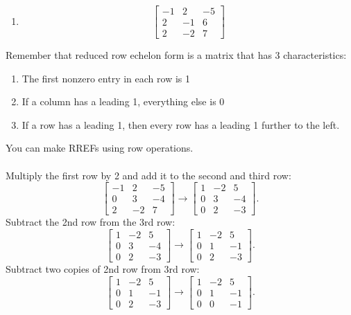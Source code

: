 \documentclass[letterpaper]{report}
\begin{document}
\begin{enumerate}[label=(\alph*)]
    \item \[\begin{bmatrix}
            -1 & 2 & -5 \\
            2 & -1 & 6 \\
            2 & -2 & 7
        \end{bmatrix}
    \] 
\end{enumerate}
Remember that reduced row echelon form is a matrix that has 3 characteristics: 
\begin{enumerate}
    \item The first nonzero entry in each row is 1 
    \item If a column has a leading 1, everything else is 0
    \item If a row has a leading 1, then every row has a leading 1 further to the left. 
\end{enumerate}
You can make RREFs using row operations. \\ \\ 
Multiply the first row by 2 and add it to the second and third row:
\[
\begin{bmatrix} 
    -1 & 2 & -5 \\
    0 & 3 & -4 \\
    2 & -2 & 7
\end{bmatrix} \to 
\begin{bmatrix} 
    1 & -2 & 5 \\
    0 & 3 & -4 \\
    0 & 2 & -3
\end{bmatrix} 
.\] 
Subtract the 2nd row from the 3rd row: 
\[
\begin{bmatrix} 
    1 & -2 & 5 \\
    0 & 3 & -4 \\
    0 & 2 & -3
\end{bmatrix} 
\to 
\begin{bmatrix} 
    1 & -2 & 5 \\
    0 & 1 & -1 \\
    0 & 2 & -3
\end{bmatrix} 
.\] 
Subtract two copies of 2nd row from 3rd row: 
\[
\begin{bmatrix} 
    1 & -2 & 5 \\
    0 & 1 & -1 \\
    0 & 2 & -3
\end{bmatrix} \to 
\begin{bmatrix} 
    1 & -2 & 5 \\
    0 & 1 & -1 \\
    0 & 0 & -1
\end{bmatrix}
.\] 
\end{document}
